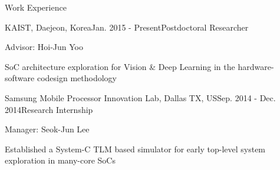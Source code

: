 \documentclass{resume} %
\begin{document}
\begin{section}{Work Experience}

\begin{subsection}{KAIST, Daejeon, Korea}{Jan. 2015 - Present}{Postdoctoral Researcher}{}
\item Advisor: Hoi-Jun Yoo
\item SoC architecture exploration for Vision \& Deep Learning in the hardware-software codesign methodology 
\end{subsection}

\begin{subsection}{Samsung Mobile Processor Innovation Lab, Dallas TX, US}{Sep. 2014 - Dec. 2014}{Research Internship}{}
\item Manager: Seok-Jun Lee
\item Established a System-C TLM based simulator for early top-level system exploration  in many-core SoCs
\end{subsection}

\end{section}

\end{document}

